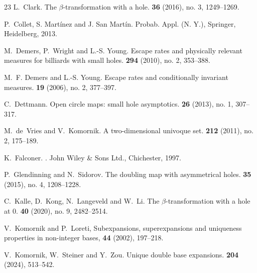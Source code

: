 \documentclass[12pt]{amsart}
\theoremstyle{definition}
\theoremstyle{remark}
\numberwithin{equation}{section}
\begin{document}
{\begin{thebibliography}{23}
L.~Clark.
\newblock The {$\beta$}-transformation with a hole.
 {\bf 36} (2016), no. 3, 1249--1269.

P.~Collet, S. Mart\'inez and J. San Mart\'in.
\newblock Probab. Appl. (N. Y.), Springer, Heidelberg, 2013.

M.~Demers, P.~Wright and L.-S. Young.
\newblock Escape rates and physically relevant measures for billiards with small holes.
 {\bf 294} (2010), no. 2, 353--388.


M.~F. Demers and L.-S. Young.
\newblock Escape rates and conditionally invariant measures.
 {\bf 19} (2006), no. 2, 377--397.

C.~Dettmann.
\newblock Open circle maps: small hole asymptotics. 
 {\bf 26} (2013), no. 1, 307--317.

M.~de~Vries and V.~Komornik.
\newblock A two-dimensional univoque set.
 {\bf 212} (2011), no. 2, 175--189.

K.~Falconer.
.
\newblock John Wiley \& Sons Ltd., Chichester, 1997.

P.~Glendinning and N.~Sidorov.
\newblock The doubling map with asymmetrical holes.
 {\bf 35} (2015), no. 4, 1208--1228.

C.~Kalle, D.~Kong, N.~Langeveld and W.~Li.
\newblock The $\beta$-transformation with a hole at 0.
 {\bf 40} (2020), no. 9, 2482--2514.

V.~Komornik and P.~Loreti,
\newblock Subexpansions, superexpansions and uniqueness properties in
  non-integer bases,
 {\bf 44} (2002), 197--218.

V.~Komornik, W.~Steiner and Y.~Zou.
\newblock Unique double base expansions.
 {\bf 204} (2024), 513--542.


\end{thebibliography}}
\end{document}
